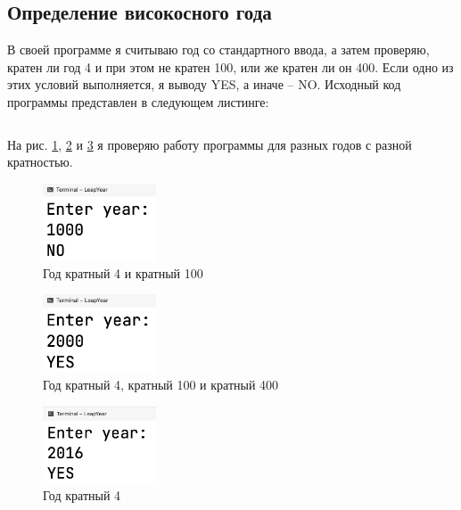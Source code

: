 \documentclass[a4paper,14pt]{extarticle}
\numberwithin{figure}{section}
\begin{document}
\subsection{Определение високосного года}

В своей программе я считываю год со стандартного ввода, а затем проверяю, кратен ли год 4 и при этом не кратен 100, или же кратен ли он 400. Если одно из этих условий выполняется, я выводу YES, а иначе -- NO. Исходный код программы представлен в следующем листинге:
\inputminted{csharp}{../LeapYear/LeapYear/Program.cs}

На рис. \ref{fig:task-3-1}, \ref{fig:task-3-2} и \ref{fig:task-3-3} я проверяю работу программы для разных годов с разной кратностью.

\begin{figure}[H]
    \centering
    \includegraphics[width=0.3\textwidth]{images/task-3-1.png}
    \caption{Год кратный 4 и кратный 100}
    \label{fig:task-3-1}
\end{figure}

\begin{figure}[H]
    \centering
    \includegraphics[width=0.3\textwidth]{images/task-3-2.png}
    \caption{Год кратный 4, кратный 100 и кратный 400}
    \label{fig:task-3-2}
\end{figure}

\begin{figure}[H]
    \centering
    \includegraphics[width=0.3\textwidth]{images/task-3-3.png}
    \caption{Год кратный 4}
    \label{fig:task-3-3}
\end{figure}
\end{document}
